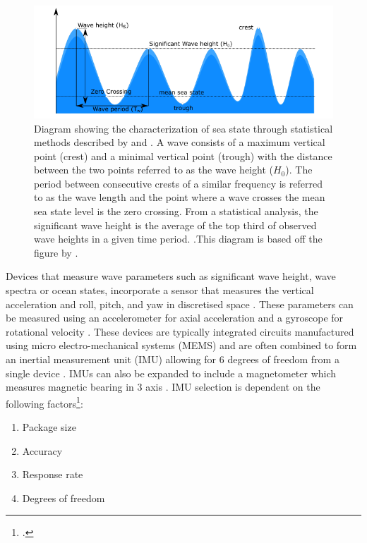 \begin{figure}[H]
	\centering
	\includegraphics[width=\linewidth]{sea state diagram.png}
	\caption{Diagram showing the characterization of sea state through statistical methods described by \textcite{kuik1988method} and \textcite{earle1996nondirectional,welch1967use}. A wave consists of a maximum vertical point (crest) and a minimal vertical point (trough) with the distance between the two points referred to as the wave height ($H_0$). The period between consecutive crests of a similar frequency is referred to as the wave length and the point where a wave crosses the mean sea state level is the zero crossing. From a statistical analysis, the significant wave height is the average of the top third of observed wave heights in a given time period. \cite{kuik1988method}.This diagram is based off the figure by \cite{seastatediag}.}
	\label{fig:seastatediag}
\end{figure}

Devices that measure wave parameters such as significant wave height, wave spectra or ocean states, incorporate a sensor that measures the vertical acceleration and roll, pitch, and yaw in discretised space \cite{earle1996nondirectional}. These parameters can be measured using an accelerometer for axial acceleration and a gyroscope for rotational velocity \cite{fong2008methods}. These devices are typically integrated circuits manufactured using micro electro-mechanical systems (MEMS) and are often combined to form an inertial measurement unit (IMU) allowing for 6 degrees of freedom from a single device \cite{fong2008methods}. IMUs can also be expanded to include a magnetometer which measures magnetic bearing in 3 axis \cite{ahmad2013reviews}. IMU selection is dependent on the following factors\footcite{ahmad2013reviews}:
\begin{enumerate}
	\item Package size
	\item Accuracy
	\item Response rate
	\item Degrees of freedom
\end{enumerate}


